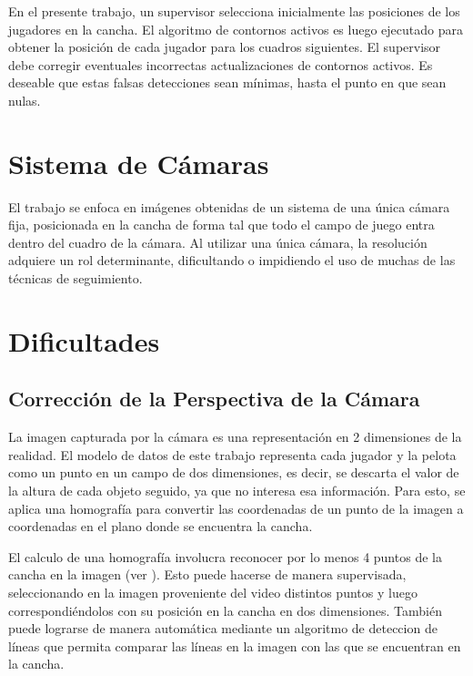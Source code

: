En el presente trabajo, un supervisor selecciona inicialmente las posiciones
de los jugadores en la cancha. El algoritmo de contornos activos es luego
ejecutado para obtener la posición de cada jugador para los cuadros siguientes.
El supervisor debe corregir eventuales incorrectas actualizaciones de contornos
activos. Es deseable que estas falsas detecciones sean mínimas, hasta el punto
en que sean nulas.

\section{Sistema de Cámaras}

El trabajo se enfoca en imágenes obtenidas de un sistema de una única cámara
fija, posicionada en la cancha de forma tal que todo el campo de juego entra
dentro del cuadro de la cámara. Al utilizar una única cámara, la resolución
adquiere un rol determinante, dificultando o impidiendo el uso de muchas de las
técnicas de seguimiento.

\section{Dificultades}


\subsection{Corrección de la Perspectiva de la Cámara}

La imagen capturada por la cámara es una representación en 2 dimensiones de la
realidad. El modelo de datos de este trabajo representa cada jugador y la
pelota como un punto en un campo de dos dimensiones, es decir, se descarta el
valor de la altura de cada objeto seguido, ya que no interesa esa información.
Para esto, se aplica una homografía para convertir las coordenadas de un punto
de la imagen a coordenadas en el plano donde se encuentra la cancha.

El calculo de una homografía involucra reconocer por lo menos 4 puntos de la
cancha en la imagen (ver \cite{homography-estimation}). Esto puede hacerse de
manera supervisada, seleccionando en la imagen proveniente del video distintos
puntos y luego correspondiéndolos con su posición en la cancha en dos
dimensiones. También puede lograrse de manera automática mediante un algoritmo
de deteccion de líneas que permita comparar las líneas en la imagen con las que
se encuentran en la cancha.

